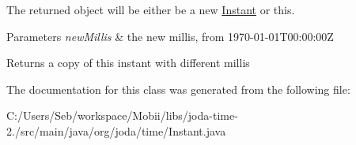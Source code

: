 The returned object will be either be a new \hyperlink{classorg_1_1joda_1_1time_1_1_instant}{Instant} or {\ttfamily this}.


\begin{DoxyParams}{Parameters}
{\em new\-Millis} & the new millis, from 1970-\/01-\/01\-T00\-:00\-:00\-Z \\
\hline
\end{DoxyParams}
\begin{DoxyReturn}{Returns}
a copy of this instant with different millis 
\end{DoxyReturn}


The documentation for this class was generated from the following file\-:\begin{DoxyCompactItemize}
\item 
C\-:/\-Users/\-Seb/workspace/\-Mobii/libs/joda-\/time-\/2./src/main/java/org/joda/time/Instant.\-java\end{DoxyCompactItemize}
